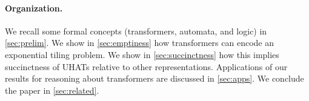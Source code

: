 \paragraph{Organization.} We recall some formal concepts (transformers,
automata, and logic) in \cref{sec:prelim}. We show in 
\cref{sec:emptiness} how transformers can encode an exponential tiling
problem. We show in \cref{sec:succinctness} how this implies succinctness
of UHATs relative to other representations. Applications of our results for
reasoning about transformers are discussed in \cref{sec:apps}. We
conclude the paper in \cref{sec:related}.

%
